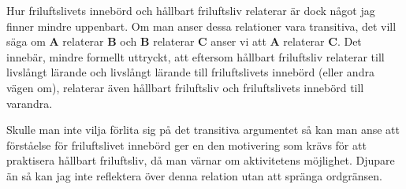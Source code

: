 \documentclass[12pt]{article}   %
\begin{document}
Hur friluftslivets innebörd och hållbart friluftsliv relaterar är dock något jag finner mindre
uppenbart. Om man anser dessa relationer vara transitiva, det vill säga om \textbf{A} relaterar \textbf{B} och
\textbf{B} relaterar \textbf{C} anser vi att \textbf{A} relaterar \textbf{C}\cite{wiki:transitive}. Det innebär, mindre formellt
uttryckt, att eftersom hållbart friluftsliv relaterar till livslångt lärande och livslångt
lärande till friluftslivets innebörd (eller andra vägen om), relaterar även hållbart
friluftsliv och friluftslivets innebörd till varandra.

Skulle man inte vilja förlita sig på det transitiva argumentet så kan man anse att förståelse
för friluftslivet innebörd ger en den motivering som krävs för att praktisera hållbart friluftsliv,
då man värnar om aktivitetens möjlighet. Djupare än så kan jag inte reflektera över denna relation
utan att spränga ordgränsen.

\pagebreak

\renewcommand{\refname}{Källor}


\end{document}
